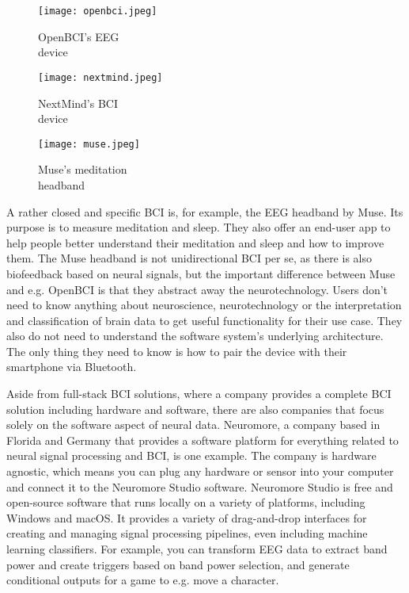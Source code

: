 \begin{figure}[!htb]
  \texttt{[image: openbci.jpeg]}
  \caption{OpenBCI's EEG \\ device \citep{be_superhvman_conor_2017}}
  \label{fig:openbci}
  \endminipage\hfill
  \texttt{[image: nextmind.jpeg]}
  \caption{NextMind's BCI \\ device \citep{louise_neurotechnology_2019}}
  \label{fig:nextmind}
  \endminipage\hfill
  \texttt{[image: muse.jpeg]}
  \caption{Muse's meditation \\ headband \citep{muse_muse_nodate}}
  \label{fig:muse}
  \endminipage
\end{figure}

A rather closed and specific BCI is, for example, the EEG headband by Muse. Its purpose is to measure meditation and sleep. They also offer an end-user app to help people better understand their meditation and sleep and how to improve them. The Muse headband is not unidirectional BCI per se, as there is also biofeedback based on neural signals, but the important difference between Muse and e.g. OpenBCI is that they abstract away the neurotechnology. Users don't need to know anything about neuroscience, neurotechnology or the interpretation and classification of brain data to get useful functionality for their use case. They also do not need to understand the software system's underlying architecture. The only thing they need to know is how to pair the device with their smartphone via Bluetooth.

Aside from full-stack BCI solutions, where a company provides a complete BCI solution including hardware and software, there are also companies that focus solely on the software aspect of neural data. Neuromore, a company based in Florida and Germany that provides a software platform for everything related to neural signal processing and BCI, is one example. The company is hardware agnostic, which means you can plug any hardware or sensor into your computer and connect it to the Neuromore Studio software. Neuromore Studio is free and open-source software that runs locally on a variety of platforms, including Windows and macOS. It provides a variety of drag-and-drop interfaces for creating and managing signal processing pipelines, even including machine learning classifiers. For example, you can transform EEG data to extract band power and create triggers based on band power selection, and generate conditional outputs for a game to e.g. move a character.

